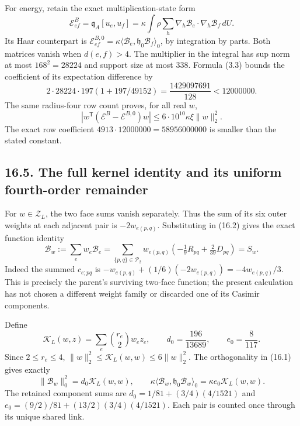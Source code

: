 \documentclass[
]{article}
\begin{document}
For energy, retain the exact multiplication-state form \[
\mathcal E^B_{ef}
 =\mathfrak q_A[u_e,u_f]
 =\kappa\int \rho\sum_h
       \nabla_h\mathcal B_e\cdot\nabla_h\mathcal B_f\,dU .
\] Its Haar counterpart is \(\mathcal E^{B,0}_{ef}
 =\kappa\langle\mathcal B_e,\mathfrak h_0\mathcal B_f\rangle_0\), by
integration by parts. Both matrices vanish when \(d(e,f)>4\). The
multiplier in the integral has sup norm at most \(168^2=28224\) and
support size at most \(338\). Formula (3.3) bounds the coefficient of
its expectation difference by \[
2\cdot28224\cdot197(1+197/49152)
=\frac{1429097691}{128}<12000000.
\] The same radius-four row count proves, for all real \(w\), \[
|w^{\mathsf T}(\mathcal E^B-\mathcal E^{B,0})w|
\le6\cdot10^{10}\kappa\xi\|w\|_2^2 .                         \tag{16.16}
\] The exact row coefficient \(4913\cdot12000000=58956000000\) is
smaller than the stated constant.

\subsection{16.5. The full kernel identity and its uniform fourth-order
remainder}\label{the-full-kernel-identity-and-its-uniform-fourth-order-remainder}

For \(w\in\mathscr Z_L\), the two face sums vanish separately. Thus the
sum of its six outer weights at each adjacent pair is \(-2w_{e(p,q)}\).
Substituting in (16.2) gives the exact function identity \[
\mathcal B_w:=\sum_e w_e\mathcal B_e
 =\sum_{\{p,q\}\in\mathscr P_2}w_{e(p,q)}
         \left(-\tfrac19R_{pq}+\tfrac2{39}D_{pq}\right)
 =S_w .                                                     \tag{16.17}
\] Indeed the summed \(c_{e;pq}\) is
\(-w_{e(p,q)}+(1/6)(-2w_{e(p,q)})=-4w_{e(p,q)}/3\). This is precisely
the parent's surviving two-face function; the present calculation has
not chosen a different weight family or discarded one of its Casimir
components.

Define \[
\mathcal K_L(w,z)=\sum_e\binom{r_e}{2}w_ez_e,\qquad
d_0=\frac{196}{13689},\qquad e_0=\frac8{117}.
\] Since \(2\le r_e\le4\),
\(\|w\|_2^2\le\mathcal K_L(w,w)\le6\|w\|_2^2\). The orthogonality in
(16.1) gives exactly \[
\|\mathcal B_w\|_0^2=d_0\mathcal K_L(w,w),\qquad
\kappa\langle\mathcal B_w,\mathfrak h_0\mathcal B_w\rangle_0
=\kappa e_0\mathcal K_L(w,w).                                \tag{16.18}
\] The retained component sums are \(d_0=1/81+(3/4)(4/1521)\) and
\(e_0=(9/2)/81+(13/2)(3/4)(4/1521)\). Each pair is counted once through
its unique shared link.
\end{document}
